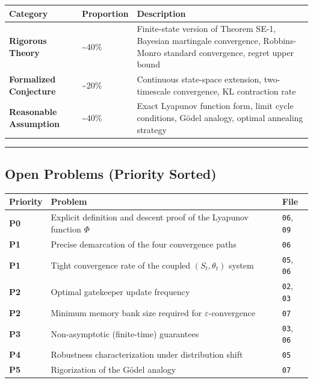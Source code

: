 \documentclass[
  12pt,
]{article}
\begin{document}
\begin{longtable}[]{@{}
  >{\raggedright\arraybackslash}p{}
  >{\raggedright\arraybackslash}p{}
  >{\raggedright\arraybackslash}p{}@{}}
\toprule\noalign{}
\begin{minipage}[b]{\linewidth}\raggedright
Category
\end{minipage} & \begin{minipage}[b]{\linewidth}\raggedright
Proportion
\end{minipage} & \begin{minipage}[b]{\linewidth}\raggedright
Description
\end{minipage} \\
\midrule\noalign{}
\endhead
\bottomrule\noalign{}
\endlastfoot
\textbf{Rigorous Theory} & \textasciitilde40\% & Finite-state version of Theorem SE-1, Bayesian martingale convergence, Robbins-Monro standard convergence, regret upper bound \\
\textbf{Formalized Conjecture} & \textasciitilde20\% & Continuous state-space extension, two-timescale convergence, KL contraction rate \\
\textbf{Reasonable Assumption} & \textasciitilde40\% & Exact Lyapunov function form, limit cycle conditions, G\"{o}del analogy, optimal annealing strategy \\
\end{longtable}

\begin{center}\rule{0.5\linewidth}{0.5pt}\end{center}

\subsection{Open Problems (Priority Sorted)}\label{open-problems-priority-sorted}

\begin{longtable}[]{@{}lll@{}}
\toprule\noalign{}
Priority & Problem & File \\
\midrule\noalign{}
\endhead
\bottomrule\noalign{}
\endlastfoot
\textbf{P0} & Explicit definition and descent proof of the Lyapunov function $\Phi$ & \texttt{06}, \texttt{09} \\
\textbf{P1} & Precise demarcation of the four convergence paths & \texttt{06} \\
\textbf{P1} & Tight convergence rate of the coupled $(S_t, \theta_t)$ system & \texttt{05}, \texttt{06} \\
\textbf{P2} & Optimal gatekeeper update frequency & \texttt{02}, \texttt{03} \\
\textbf{P2} & Minimum memory bank size required for $\varepsilon$-convergence & \texttt{07} \\
\textbf{P3} & Non-asymptotic (finite-time) guarantees & \texttt{03}, \texttt{06} \\
\textbf{P4} & Robustness characterization under distribution shift & \texttt{05} \\
\textbf{P5} & Rigorization of the G\"{o}del analogy & \texttt{07} \\
\end{longtable}
\end{document}
